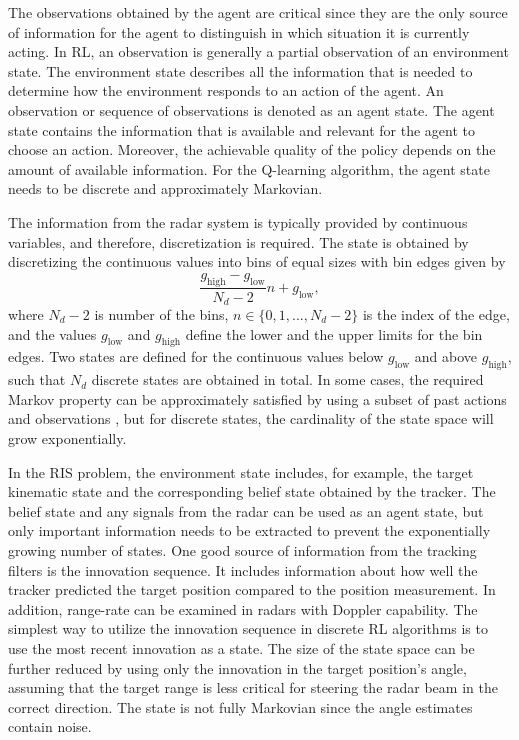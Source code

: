 \documentclass[english, 12pt, a4paper, elec, utf8, a-1b, online]{aaltothesis}
\numberwithin{equation}{section}
\newcommand{\glow}{g_\text{low}}
\newcommand{\ghigh}{g_\text{high}}
\begin{document}
The observations obtained by the agent are critical since they are the only source of information for the agent to distinguish in which situation it is currently acting.
In RL, an observation is generally a partial observation of an environment state.
The environment state describes all the information that is needed to determine how the environment responds to an action of the agent. 
An observation or sequence of observations is denoted as an agent state.
The agent state contains the information that is available and relevant for the agent to choose an action.
Moreover, the achievable quality of the policy depends on the amount of available information.
For the Q-learning algorithm, the agent state needs to be discrete and approximately Markovian.

The information from the radar system is typically provided by continuous variables, and therefore, discretization is required.
The state is obtained by discretizing the continuous values into bins of equal sizes with bin edges given by
\begin{equation}\label{eq:state_limits}
    \frac{\ghigh - \glow}{N_d - 2} n + \glow,
\end{equation}
where $N_d-2$ is number of the bins, $n \in \{0, 1, ..., N_d-2\}$ is the index of the edge, and
the values $\glow$ and $\ghigh$ define the lower and the upper limits for the bin edges.
Two states are defined for the continuous values below $\glow$ and above $\ghigh$, such that $N_d$ discrete states are obtained in total.
In some cases, the required Markov property can be approximately satisfied by using a subset of past actions and observations \cite{Mnih2013}, but for discrete states, the cardinality of the state space will grow exponentially.


In the RIS problem, 
the environment state includes, for example, the target kinematic state and the corresponding belief state obtained by the tracker. 
The belief state and any signals from the radar can be used as an agent state, but only important information needs to be extracted to prevent the exponentially growing number of states. 
One good source of information from the tracking filters is the innovation sequence. 
It includes information about how well the tracker predicted the target position compared to the position measurement. 
In addition, range-rate can be examined in radars with Doppler capability. 
The simplest way to utilize the innovation sequence in discrete RL algorithms is to use the most recent innovation as a state. 
The size of the state space can be further reduced by using only the innovation in the target position's angle, assuming that the target range is less critical for steering the radar beam in the correct direction.
The state is not fully Markovian since the angle estimates contain noise. 
\end{document}
